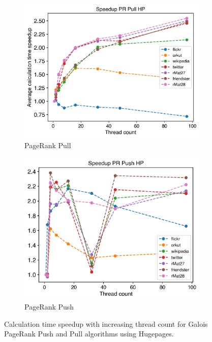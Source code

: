 \begin{figure}
	\begin{subfigure}{\columnwidth}
		\includegraphics[width=\linewidth]{../../plots/singleNodePRPullGaloisHPThreads.png}
		\caption{PageRank Pull}
		\label{fig:galoisHPSpeedupPRPull}
	\end{subfigure}
	\begin{subfigure}{\columnwidth}
		\includegraphics[width=\linewidth]{../../plots/singleNodePRPushGaloisHPThreads.png}
		\caption{PageRank Push}
		\label{fig:galoisHPSpeedupPRPush}
	\end{subfigure}
	\caption{Calculation time speedup with increasing thread count for Galois PageRank Push and Pull algorithms using Hugepages.}
\end{figure}

